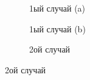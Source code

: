 \begin{figure}[H]
  \centering
  
  \begin{subfigure}[b]{0.3\textwidth}
    \centering
    
    \caption{1ый случай (a)}\label{fig:hall-case-1-a}

  \end{subfigure}
  \qquad
  \begin{subfigure}[b]{0.3\textwidth}

    \centering
    
    \caption{1ый случай (b)}\label{fig:hall-case-1-b}

  \end{subfigure}
  \qquad
  \begin{subfigure}[b]{0.3\textwidth}

    \centering
    
    \caption{2ой случай}\label{fig:hall-case-2}

  \end{subfigure}
\end{figure}